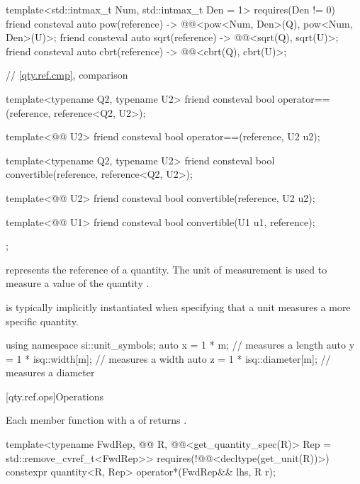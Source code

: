 \begin{codeblock}
{{  template<std::intmax_t Num, std::intmax_t Den = 1>
    requires(Den != 0)
  friend consteval auto pow(reference) -> @@<pow<Num, Den>(Q{}), pow<Num, Den>(U{})>;
  friend consteval auto sqrt(reference) -> @@<sqrt(Q{}), sqrt(U{})>;
  friend consteval auto cbrt(reference) -> @@<cbrt(Q{}), cbrt(U{})>;

  // \ref{qty.ref.cmp}, comparison

  template<typename Q2, typename U2>
  friend consteval bool operator==(reference, reference<Q2, U2>);

  template<@@ U2>
  friend consteval bool operator==(reference, U2 u2);

  template<typename Q2, typename U2>
  friend consteval bool convertible(reference, reference<Q2, U2>);

  template<@@ U2>
  friend consteval bool convertible(reference, U2 u2);

  template<@@ U1>
  friend consteval bool convertible(U1 u1, reference);
};

}
\end{codeblock}

\pnum
{} represents the reference of a quantity.
The unit of measurement 
is used to measure a value of the quantity .
\begin{note}
 is typically implicitly instantiated
when specifying that a unit measures a more specific quantity.
\begin{example}
\begin{codeblock}
using namespace si::unit_symbols;
auto x = 1 * m;                 // measures a length
auto y = 1 * isq::width[m];     // measures a width
auto z = 1 * isq::diameter[m];  // measures a diameter
\end{codeblock}
\end{example}
\end{note}

[qty.ref.ops]{Operations}

\pnum
Each member function with a 
of 
returns \tcode{\{\}}.

\begin{itemdecl}
template<typename FwdRep, @@ R,
         @@<get_quantity_spec(R{})> Rep = std::remove_cvref_t<FwdRep>>
  requires(!@@<decltype(get_unit(R{}))>)
constexpr quantity<R{}, Rep> operator*(FwdRep&& lhs, R r);
\end{itemdecl}

